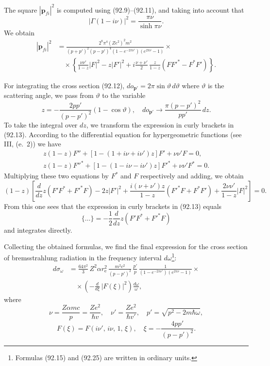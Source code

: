 
The square $|\mathbf{p}_{fi}|^2$ is computed using (92.9)--(92.11), and taking into account that
\[
|\Gamma(1 - i\nu)|^2 = \frac{\pi\nu}{\sinh\pi\nu}.
\]
We obtain
\begin{equation}
\begin{split}
|\mathbf{p}_{fi}|^2 &= \frac{2^8\pi^4(Ze^2)^2m^2}{(p+p')^2(p-p')^4(1-e^{-2\pi\nu'})(e^{2\pi\nu}-1)} \times {} \\
&\quad \times \left\{\frac{\nu\nu'}{1-z}|F|^2 - z|F'|^2 + i\frac{\nu+\nu'}{2}\,\frac{z}{1-z}(FF'^* - F^*F')\right\}.
\end{split}
\label{eq:92.13}
\end{equation}

For integrating the cross section (92.12), $do_{\mathbf{p}'} = 2\pi\sin\vartheta\,d\vartheta$ where $\vartheta$ is the scattering angle, we pass from $\vartheta$ to the variable
\[
z = -\frac{2pp'}{(p-p')^2}(1-\cos\vartheta), \quad do_{\mathbf{p}'} \to \frac{\pi(p-p')^2}{pp'}\,dz.
\]
To take the integral over $dz$, we transform the expression in curly brackets in (92.13). According to the differential equation for hypergeometric functions (see III, (e.~2)) we have
\begin{gather*}
z(1-z)F'' + [1 - (1+i\nu+i\nu')z]F' + \nu\nu' F = 0, \\
z(1-z)F''^* + [1 - (1-i\nu-i\nu')z]F'^* + \nu\nu' F^* = 0.
\end{gather*}
Multiplying these two equations by $F^*$ and $F$ respectively and adding, we obtain
\[
(1-z)\left[\frac{d}{dz}z(F'F^* + F'^*F) - 2z|F'|^2 + \frac{i(\nu+\nu')z}{1-z}(F'^*F + F^*F') + \frac{2\nu\nu'}{1-z}|F|^2\right] = 0.
\]
From this one sees that the expression in curly brackets in (92.13) equals
\begin{equation}
\{\ldots\} = -\frac{1}{2}\frac{d}{dz}z(F'F^* + F'^*F)
\label{eq:92.14a}
\end{equation}
and integrates directly.


Collecting the obtained formulas, we find the final expression for the cross section of bremsstrahlung radiation in the frequency interval $d\omega$\footnote{Formulas (92.15) and (92.25) are written in ordinary units.}:
\begin{equation}
\begin{split}
d\sigma_\omega &= \frac{64\pi^2}{3}\,Z^2\alpha r_\mathrm{e}^2\,\frac{m^2c^2}{(p-p')^2}\,\frac{p'}{p}\,\frac{1}{(1-e^{-2\pi\nu'})(e^{2\pi\nu}-1)} \times {} \\
&\quad \times \left(-\frac{d}{d\xi}\,|F(\xi)|^2\right)\frac{d\omega}{\omega},
\end{split}
\label{eq:92.15}
\end{equation}
where
\[
\nu = \frac{Z\alpha mc}{p} = \frac{Ze^2}{\hbar v}, \quad \nu' = \frac{Ze^2}{\hbar v'}, \quad p' = \sqrt{p^2 - 2m\hbar\omega},
\]
\[
F(\xi) = F(i\nu',\,i\nu,\,1,\,\xi), \quad \xi = -\frac{4pp'}{(p-p')^2}.
\]

